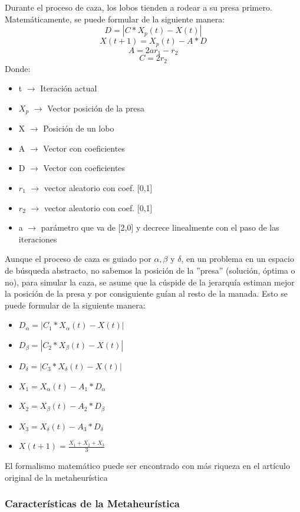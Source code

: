 \documentclass[a4paper]{report}
\begin{document}
Durante el proceso de caza, los lobos tienden a rodear a su presa primero. Matemáticamente, se puede formular de la siguiente manera:
$$D=|C*X_p(t)-X(t)| $$
$$X(t+1)=X_p(t)-A*D$$
$$A=2ar_1-r_2$$
$$C=2r_2$$
Donde:
\begin{itemize}
    \item t $\rightarrow$ Iteración actual
    \item $X_p$ $\rightarrow$ Vector posición de la presa
    \item X $\rightarrow$ Posición de un lobo
    \item A $\rightarrow$ Vector con coeficientes
    \item D $\rightarrow$ Vector con coeficientes
    \item $r_1$ $\rightarrow$ vector aleatorio con coef. [0,1]
    \item $r_2$ $\rightarrow$ vector aleatorio con coef. [0,1]
    \item a $\rightarrow$ parámetro que va de [2,0] y decrece linealmente con el paso de las iteraciones
\end{itemize}


Aunque el proceso de caza es guiado por $\alpha,\beta$ y $\delta$, en un problema en un espacio de búsqueda abstracto, no sabemos la posición de la ''presa'' (solución, óptima o no), para simular la caza, se asume que la cúspide de la jerarquía estiman mejor la posición de la presa y por consiguiente guían al resto de la manada. Esto se puede formular de la siguiente manera:


\begin{itemize}
    \item $D_\alpha=|C_1*X_\alpha(t)-X(t)| $
    \item $D_\beta=|C_2*X_\beta(t)-X(t)| $
    \item $D_\delta=|C_3*X_\delta(t)-X(t)| $
    \item $X_1=X_\alpha(t)-A_1*D_\alpha$
    \item $X_2=X_\beta(t)-A_2*D_\beta$
    \item $X_3=X_\delta(t)-A_3*D_\delta$
    \item $X(t+1)=\frac{X_1+X_2+X_3}{3}$
\end{itemize}

El formalismo matemático puede ser encontrado con más riqueza en el artículo original de la metaheurística  \cite{MIRJALILI201446}

\subsubsection{Características de la Metaheurística}
\end{document}
